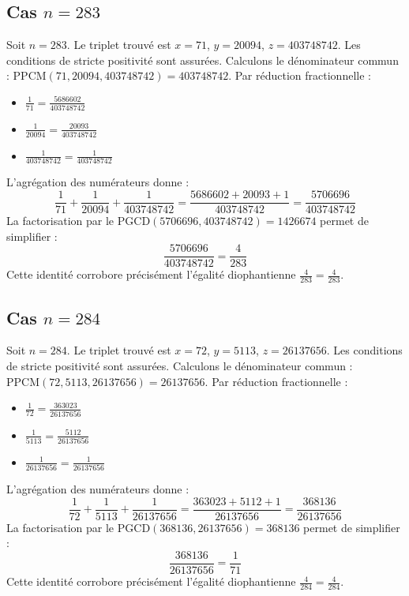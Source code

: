 \documentclass[11pt,a4paper]{article}
\begin{document}
\subsection{Cas $n = 283$}
Soit $n = 283$. Le triplet trouvé est $x = 71$, $y = 20094$, $z = 403748742$.
Les conditions de stricte positivité sont assurées.
Calculons le dénominateur commun : $\text{PPCM}(71, 20094, 403748742) = 403748742$.
Par réduction fractionnelle :
\begin{itemize}
    \item $\frac{1}{71} = \frac{5686602}{403748742}$
    \item $\frac{1}{20094} = \frac{20093}{403748742}$
    \item $\frac{1}{403748742} = \frac{1}{403748742}$
\end{itemize}
L'agrégation des numérateurs donne :
$$ \frac{1}{71} + \frac{1}{20094} + \frac{1}{403748742} = \frac{5686602 + 20093 + 1}{403748742} = \frac{5706696}{403748742} $$
La factorisation par le $\text{PGCD}(5706696, 403748742) = 1426674$ permet de simplifier :
$$ \frac{5706696}{403748742} = \frac{4}{283} $$
Cette identité corrobore précisément l'égalité diophantienne $\frac{4}{283} = \frac{4}{283}$.

\subsection{Cas $n = 284$}
Soit $n = 284$. Le triplet trouvé est $x = 72$, $y = 5113$, $z = 26137656$.
Les conditions de stricte positivité sont assurées.
Calculons le dénominateur commun : $\text{PPCM}(72, 5113, 26137656) = 26137656$.
Par réduction fractionnelle :
\begin{itemize}
    \item $\frac{1}{72} = \frac{363023}{26137656}$
    \item $\frac{1}{5113} = \frac{5112}{26137656}$
    \item $\frac{1}{26137656} = \frac{1}{26137656}$
\end{itemize}
L'agrégation des numérateurs donne :
$$ \frac{1}{72} + \frac{1}{5113} + \frac{1}{26137656} = \frac{363023 + 5112 + 1}{26137656} = \frac{368136}{26137656} $$
La factorisation par le $\text{PGCD}(368136, 26137656) = 368136$ permet de simplifier :
$$ \frac{368136}{26137656} = \frac{1}{71} $$
Cette identité corrobore précisément l'égalité diophantienne $\frac{4}{284} = \frac{4}{284}$.
\end{document}
